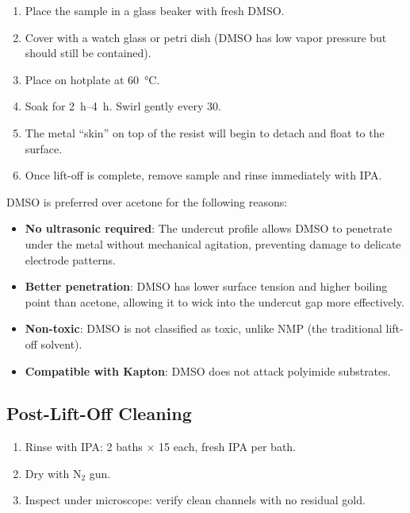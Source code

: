 \documentclass[11pt,a4paper]{article}
\begin{document}
\begin{enumerate}[label=\alph*)]
    \item Place the sample in a glass beaker with fresh DMSO.
    \item Cover with a watch glass or petri dish (DMSO has low vapor
          pressure but should still be contained).
    \item Place on hotplate at \SI{60}{\celsius}.
    \item Soak for \SIrange{2}{4}{\hour}. Swirl gently every
          \SI{30}{\min}.
    \item The metal ``skin'' on top of the resist will begin to detach
          and float to the surface.
    \item Once lift-off is complete, remove sample and rinse immediately
          with IPA.
\end{enumerate}

\begin{warningbox}
DMSO is preferred over acetone for the following reasons:
\begin{itemize}
    \item \textbf{No ultrasonic required}: The undercut profile allows
          DMSO to penetrate under the metal without mechanical agitation,
          preventing damage to delicate electrode patterns.
    \item \textbf{Better penetration}: DMSO has lower surface tension
          and higher boiling point than acetone, allowing it to wick into
          the undercut gap more effectively.
    \item \textbf{Non-toxic}: DMSO is not classified as toxic, unlike
          NMP (the traditional lift-off solvent).
    \item \textbf{Compatible with Kapton}: DMSO does not attack
          polyimide substrates.
\end{itemize}
\end{warningbox}

\subsection{Post-Lift-Off Cleaning}

\begin{enumerate}[label=\alph*)]
    \item Rinse with IPA: 2 baths $\times$ \SI{15}{\min} each,
          fresh IPA per bath.
    \item Dry with N$_2$ gun.
    \item Inspect under microscope: verify clean channels with no
          residual gold.
\end{enumerate}
\end{document}
